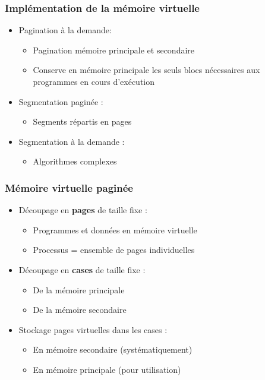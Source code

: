 \begin{frame}
\frametitle{Implémentation de la mémoire virtuelle}
\begin{itemize}
\item Pagination à la demande:
\begin{itemize}
\item Pagination mémoire principale et secondaire
\item Conserve en mémoire principale les seuls blocs nécessaires aux programmes en cours d'exécution
\end{itemize}
\item Segmentation paginée :
\begin{itemize}
\item Segments répartis en pages
\end{itemize}
\item Segmentation à la demande :
\begin{itemize}
\item Algorithmes complexes
\end{itemize}
\end{itemize}
\end{frame}


\begin{frame}
\frametitle{Mémoire virtuelle paginée}
\begin{itemize}
\item Découpage en \textbf{pages} de taille fixe :
\begin{itemize}
\item Programmes et données en mémoire virtuelle
\item Processus = ensemble de pages individuelles
\end{itemize}
\item Découpage en \textbf{cases} de taille fixe :
\begin{itemize}
\item De la mémoire principale
\item De la mémoire secondaire
\end{itemize}
\item Stockage pages virtuelles dans les cases :
\begin{itemize}
\item En mémoire secondaire (systématiquement)
\item En mémoire principale (pour utilisation)
\end{itemize}
\end{itemize}
\end{frame}


